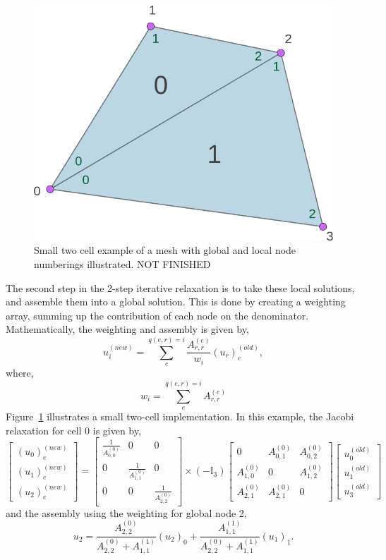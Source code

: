 \begin{figure}
	\centering
	\includegraphics[width = 0.35\linewidth]{Figures/2cell2.png}
	\caption{Small two cell example of a mesh with global and local node numberings illustrated. NOT FINISHED}
	\label{fig:2cell2}
\end{figure}
The second step in the 2-step iterative relaxation is to take these local solutions, and assemble them into a global solution. This is done by creating a weighting array, summing up the contribution of each node on the denominator. Mathematically, the weighting and assembly is given by,
\begin{equation}\label{weight}
	u_i^{(new)} = \sum_e^{q(e,r) = i}\frac{A^{(e)}_{r,r}}{w_i} (u_r)_e^{(old)},
\end{equation}
where,
\begin{equation}
	w_i = \sum_e^{q(e,r) = i}A^{(e)}_{r,r}
\end{equation}
Figure~\ref{fig:2cell2} illustrates a small two-cell implementation. In this example, the Jacobi relaxation for cell 0 is given by,
\begin{equation}
	\left[\begin{matrix}
		(u_0)_e^{(new)} \\
		(u_1)_e^{(new)} \\
		(u_2)_e^{(new)}
	\end{matrix}\right] = 
	\left[\begin{matrix}
		\frac{1}{A^{(0)}_{0,0}} & 0 & 0 \\
		0 & \frac{1}{A^{(0)}_{1,1}} & 0 \\
		0 & 0 & \frac{1}{A^{(0)}_{2,2}}
	\end{matrix} \right]
	\times (-\mathbb{I}_3)
	\left[\begin{matrix}
		0 & A^{(0)}_{0,1} & A^{(0)}_{0,2} \\
		A^{(0)}_{1,0} & 0 & A^{(0)}_{1,2} \\
		A^{(0)}_{2,1} & A^{(0)}_{2,1} & 0 
	\end{matrix}\right]
	\left[\begin{matrix}
		u_0^{(old)} \\
		u_1^{(old)} \\
		u_3^{(old)}
	\end{matrix}\right]
\end{equation}
and the assembly using the weighting for global node 2,
\begin{equation}
	u_2 = \frac{A^{(0)}_{2,2}}{A^{(0)}_{2,2} + A^{(1)}_{1,1} } (u_2)_0 + \frac{A^{(1)}_{1,1}}{A^{(0)}_{2,2} + A^{(1)}_{1,1} } (u_1)_1.
\end{equation}

